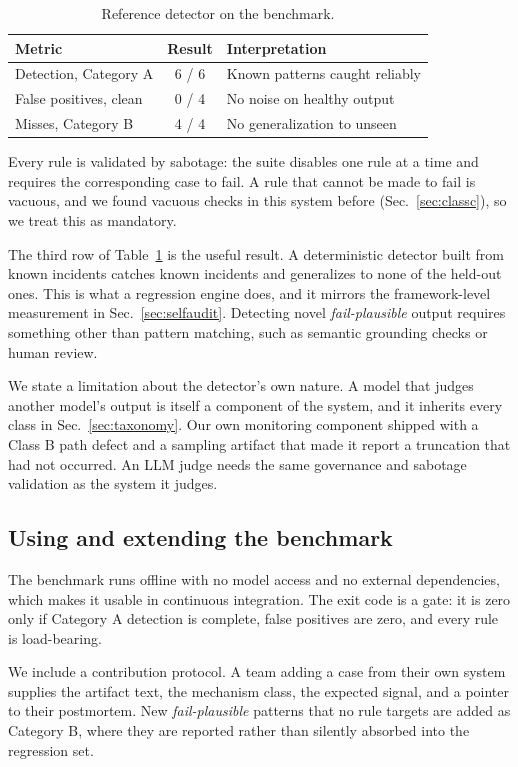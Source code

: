 \documentclass[conference]{IEEEtran}
\newcommand{\failplausible}{\emph{fail-plausible}}
\begin{document}
\begin{table}[t]
\caption{Reference detector on the benchmark.}
\label{tab:detector}
\centering
\footnotesize
\begin{tabular}{@{}l c l@{}}
\toprule
Metric & Result & Interpretation \\
\midrule
Detection, Category A & 6 / 6 & Known patterns caught reliably \\
False positives, clean & 0 / 4 & No noise on healthy output \\
Misses, Category B & 4 / 4 & No generalization to unseen \\
\bottomrule
\end{tabular}
\end{table}

Every rule is validated by sabotage: the suite disables one rule at a time
and requires the corresponding case to fail. A rule that cannot be made to
fail is vacuous, and we found vacuous checks in this system before
(Sec.~\ref{sec:classc}), so we treat this as mandatory.

The third row of Table~\ref{tab:detector} is the useful result. A
deterministic detector built from known incidents catches known incidents
and generalizes to none of the held-out ones. This is what a regression
engine does, and it mirrors the framework-level measurement in
Sec.~\ref{sec:selfaudit}. Detecting novel \failplausible{} output requires
something other than pattern matching, such as semantic grounding checks or
human review.

We state a limitation about the detector's own nature. A model that judges
another model's output is itself a component of the system, and it inherits
every class in Sec.~\ref{sec:taxonomy}. Our own monitoring component shipped
with a Class B path defect and a sampling artifact that made it report a
truncation that had not occurred. An LLM judge needs the same governance and
sabotage validation as the system it judges.

\subsection{Using and extending the benchmark}

The benchmark runs offline with no model access and no external
dependencies, which makes it usable in continuous integration. The exit code
is a gate: it is zero only if Category A detection is complete, false
positives are zero, and every rule is load-bearing.

We include a contribution protocol. A team adding a case from their own
system supplies the artifact text, the mechanism class, the expected signal,
and a pointer to their postmortem. New \failplausible{} patterns that no
rule targets are added as Category B, where they are reported rather than
silently absorbed into the regression set.
\end{document}
